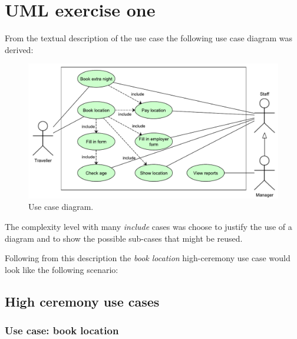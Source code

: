 \chapter{UML exercise one}\label{ch:uml}

From the textual description of the use case the following use case diagram was derived:

\begin{figure}[H]
\begin{center}
\includegraphics[width=\textwidth]{gfx/usecase.pdf} 
\end{center}
\caption{Use case diagram.}
\label{fig:usecase}
\end{figure}

The complexity level with many \textit{include} cases was choose to justify the use of a diagram and to show the possible sub-cases that might be reused.

Following from this description the \textit{book location} high-ceremony use case would look like the following scenario:

\section{High ceremony use cases}

\subsection{Use case: book location}

